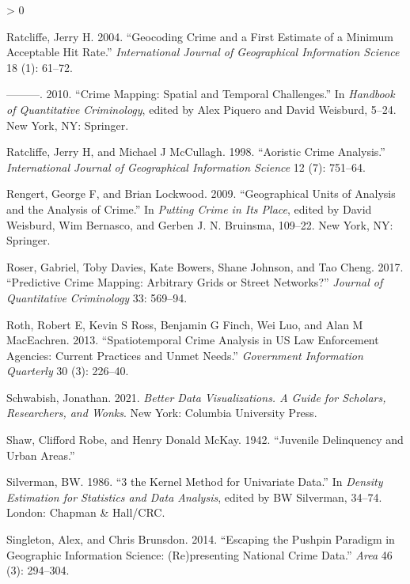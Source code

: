 \documentclass[
  krantz2]{krantz}
\newlength{\cslhangindent}
\newenvironment{CSLReferences}[2] %
 {%
  \setlength{\parindent}{0pt}
  \ifodd #1 \everypar{\setlength{\hangindent}{\cslhangindent}}\ignorespaces\fi
  \ifnum #2 > 0
  \setlength{\parskip}{#2\baselineskip}
  \fi
 }%
 {}
\begin{document}
\begin{CSLReferences}{1}{0}
\leavevmode\hypertarget{ref-Ratcliffe_2004}{}%
Ratcliffe, Jerry H. 2004. {``Geocoding Crime and a First Estimate of a Minimum Acceptable Hit Rate.''} \emph{International Journal of Geographical Information Science} 18 (1): 61--72.

\leavevmode\hypertarget{ref-Ratcliffe_2010}{}%
---------. 2010. {``Crime Mapping: Spatial and Temporal Challenges.''} In \emph{Handbook of Quantitative Criminology}, edited by Alex Piquero and David Weisburd, 5--24. New York, NY: Springer.

\leavevmode\hypertarget{ref-Ratcliffe_1998}{}%
Ratcliffe, Jerry H, and Michael J McCullagh. 1998. {``Aoristic Crime Analysis.''} \emph{International Journal of Geographical Information Science} 12 (7): 751--64.

\leavevmode\hypertarget{ref-Rengert_2009}{}%
Rengert, George F, and Brian Lockwood. 2009. {``Geographical Units of Analysis and the Analysis of Crime.''} In \emph{Putting Crime in Its Place}, edited by David Weisburd, Wim Bernasco, and Gerben J. N. Bruinsma, 109--22. New York, NY: Springer.

\leavevmode\hypertarget{ref-Rosser_2017}{}%
Roser, Gabriel, Toby Davies, Kate Bowers, Shane Johnson, and Tao Cheng. 2017. {``Predictive Crime Mapping: Arbitrary Grids or Street Networks?''} \emph{Journal of Quantitative Criminology} 33: 569--94.

\leavevmode\hypertarget{ref-Roth_2013}{}%
Roth, Robert E, Kevin S Ross, Benjamin G Finch, Wei Luo, and Alan M MacEachren. 2013. {``Spatiotemporal Crime Analysis in US Law Enforcement Agencies: Current Practices and Unmet Needs.''} \emph{Government Information Quarterly} 30 (3): 226--40.

\leavevmode\hypertarget{ref-Schwabish_2021}{}%
Schwabish, Jonathan. 2021. \emph{Better Data Visualizations. A Guide for Scholars, Researchers, and Wonks}. New York: Columbia University Press.

\leavevmode\hypertarget{ref-Shaw_1942}{}%
Shaw, Clifford Robe, and Henry Donald McKay. 1942. {``Juvenile Delinquency and Urban Areas.''}

\leavevmode\hypertarget{ref-Silverman_1986}{}%
Silverman, BW. 1986. {``3 the Kernel Method for Univariate Data.''} In \emph{Density Estimation for Statistics and Data Analysis}, edited by BW Silverman, 34--74. London: Chapman \& Hall/CRC.

\leavevmode\hypertarget{ref-Singleton_2014}{}%
Singleton, Alex, and Chris Brunsdon. 2014. {``Escaping the Pushpin Paradigm in Geographic Information Science: (Re)presenting National Crime Data.''} \emph{Area} 46 (3): 294--304.


\end{CSLReferences}
\end{document}
